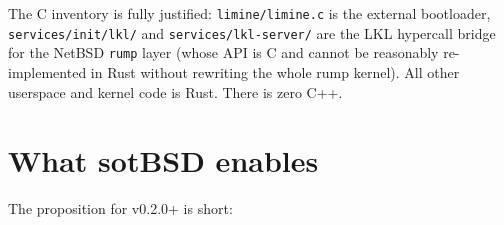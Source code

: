\documentclass[11pt,a4paper]{article}
\begin{document}
The C inventory is fully justified: \texttt{limine/limine.c} is the
external bootloader, \texttt{services/init/lkl/} and
\texttt{services/lkl-server/} are the LKL hypercall bridge for the
NetBSD \texttt{rump} layer (whose API is C and cannot be reasonably
re-implemented in Rust without rewriting the whole rump kernel). All
other userspace and kernel code is Rust. There is zero C++.

\section{What sotBSD enables}

The proposition for v0.2.0+ is short:
\end{document}
